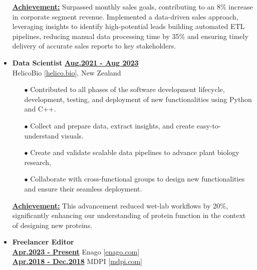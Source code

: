 \begin{itemize}[leftmargin=5mm]
\begin{itemize}[leftmargin=0mm]

          \end{itemize}

          \textbf{\href{.}{\underline{Achievement:}}}
          Surpassed monthly sales goals, contributing to an 8\% increase in corporate segment revenue. Implemented a data-driven sales approach, leveraging insights to identify high-potential leads building automated ETL pipelines, reducing manual data processing time by 35\% and ensuring timely delivery of accurate sales reports to key stakeholders.


    \item \textbf{\large Data Scientist}\hfill
          \href{.}{\bf Aug.2021 - Aug 2023}\\
          HelicoBio [\href{www.helico.bio}{helico.bio}],
          New Zealand

          \begin{itemize}[leftmargin=0mm]
              \small

              \item[$\bullet$] Contributed to all phases of the software development lifecycle, development, testing, and deployment of new functionalities using Python and C++.
              \item[$\bullet$] Collect and prepare data, extract insights, and create easy-to-understand visuals.
              \item[$\bullet$] Create and validate scalable data pipelines to advance plant biology research,
              \item[$\bullet$] Collaborate with cross-functional groups to design new functionalities and ensure their seamless deployment.
          \end{itemize}

          \textbf{\href{.}{\underline{Achievement:}}}
          This advancement reduced wet-lab workflows by 20\%, significantly enhancing our understanding of protein function in the context of designing new proteins.

    \item \textbf{\large Freelancer Editor}\\
          \href{.}{\bf Apr.2023 - Present}\hfill
          Enago [\href{https://www.enago.com/}{enago.com}]\\
          \href{.}{\bf Apr.2018 - Dec.2018}\hfill
          MDPI [\href{https://www.mdpi.com/}{mdpi.com}]


\end{itemize}
